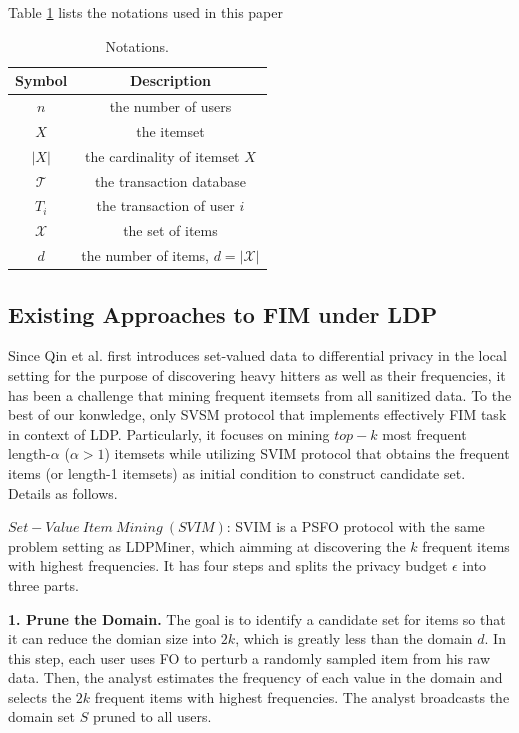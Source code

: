 \documentclass[conference]{IEEEtran}
\begin{document}
{\color{red}Table \ref{notations} lists the notations used in this paper}

\begin{table}[tbp]
\caption{Notations.}
\begin{center}
\begin{tabular}{|c|c|}\hline
  Symbol&Description \\\hline
  $n$ & the number of users \\\hline
  $X$ & the itemset \\\hline
  $|X|$ & the cardinality of itemset $X$ \\\hline
  $\mathcal{T}$ & the transaction database \\\hline
  $T_i$ & the transaction of user $i$ \\\hline
  $\mathcal{X}$ & the set of items \\\hline
  $d$ & the number of items, $d = |\mathcal{X}|$ \\\hline
\end{tabular}
\label{notations}
\end{center}
\end{table}

\subsection{Existing Approaches to FIM under LDP}
Since Qin et al.\cite{a1} first introduces set-valued data to differential privacy in the local setting for the purpose of discovering heavy hitters as well as their frequencies, it has been a challenge that mining frequent itemsets from all sanitized data. To the best of our konwledge, only SVSM\cite{a2} protocol that implements effectively FIM task in context of LDP. Particularly, it focuses on mining $top-k$ most frequent length-$\alpha$ ($\alpha>1$) itemsets while utilizing SVIM\cite{a2} protocol that obtains the frequent items (or length-1 itemsets) as initial condition to construct candidate set. Details as follows. 

$Set-Value\ Item\ Mining\ (SVIM)$: SVIM is a PSFO protocol with the same problem setting as LDPMiner\cite{a1}, which aimming at discovering the $k$ frequent items with highest frequencies. It has four steps and {\color{red}splits the privacy budget $\epsilon$ into three parts.}

\textbf{1. Prune the Domain.} The goal is to identify a candidate set for items so that it can reduce the domian size into $2k$, which is greatly less than the domain $d$. In this step, each user uses FO to perturb a randomly sampled item from his raw data. Then, the analyst estimates the frequency of each value in the domain and selects the $2k$ frequent items with highest frequencies. The analyst broadcasts the domain set $S$ pruned to all users.
\end{document}
